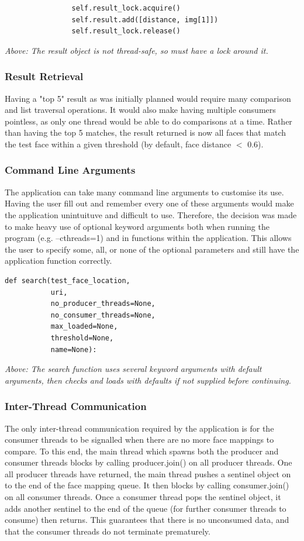 \documentclass{article}
\begin{document}
\begin{lstlisting}
				self.result_lock.acquire()
                self.result.add([distance, img[1]])
                self.result_lock.release()
\end{lstlisting}
\textit{Above: The result object is not thread-safe, so must have a lock around it.}

\subsubsection{Result Retrieval}
Having a "top 5" result as was initially planned would require many comparison and list traversal operations. It would also make having multiple consumers pointless, as only one thread would be able to do comparisons at a time. Rather than having the top 5 matches, the result returned is now all faces that match the test face within a given threshold (by default, face distance $<$ 0.6).

\subsubsection{Command Line Arguments}
The application can take many command line arguments to customise its use. Having the user fill out and remember every one of these arguments would make the application unintuituve and difficult to use. Therefore, the decision was made to make heavy use of optional keyword arguments both when running the program (e.g. --cthreads=1) and in functions within the application. This allows the user to specify some, all, or none of the optional parameters and still have the application function correctly. 

\begin{lstlisting}
def search(test_face_location,
           uri,
           no_producer_threads=None,
           no_consumer_threads=None,
           max_loaded=None,
           threshold=None,
           name=None):
\end{lstlisting}
\textit{Above: The search function uses several keyword arguments with default arguments, then checks and loads with defaults if not supplied before continuing.}

\subsubsection{Inter-Thread Communication}
The only inter-thread communication required by the application is for the consumer threads to be signalled when there are no more face mappings to compare. To this end, the main thread which spawns both the producer and consumer threads blocks by calling producer.join() on all producer threads. One all producer threads have returned, the main thread pushes a sentinel object on to the end of the face mapping queue. It then blocks by calling consumer.join() on all consumer threads. Once a consumer thread pops the sentinel object, it adds another sentinel to the end of the queue (for further consumer threads to consume) then returns. This guarantees that there is no unconsumed data, and that the consumer threads do not terminate prematurely.
\end{document}
